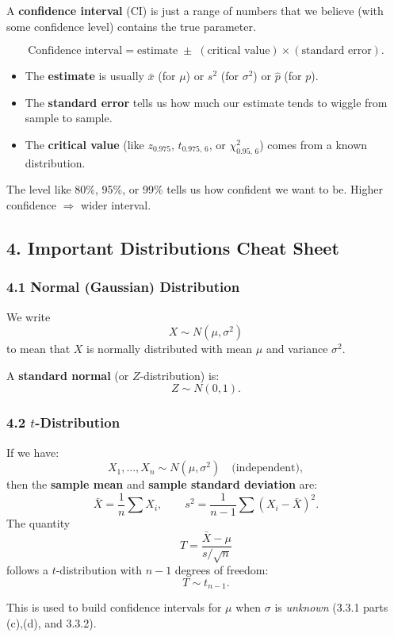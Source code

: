 \documentclass[11pt,letterpaper]{article}
\theoremstyle{remark}
\begin{document}
A \textbf{confidence interval} (CI) is just a range of numbers that we believe (with some confidence level) contains the true parameter.

\[
\text{Confidence interval} = \text{estimate} \;\pm\; (\text{critical value}) \times (\text{standard error}).
\]

\begin{itemize}
    \item The \textbf{estimate} is usually $\bar{x}$ (for $\mu$) or $s^2$ (for $\sigma^2$) or $\hat{p}$ (for $p$).
    \item The \textbf{standard error} tells us how much our estimate tends to wiggle from sample to sample.
    \item The \textbf{critical value} (like $z_{0.975}$, $t_{0.975,\,6}$, or $\chi^2_{0.95,\,6}$) comes from a known distribution.
\end{itemize}

The level like 80\%, 95\%, or 99\% tells us how confident we want to be.
Higher confidence $\Rightarrow$ wider interval.

\subsection*{4. Important Distributions Cheat Sheet}

\subsubsection*{4.1 Normal (Gaussian) Distribution}

We write
\[
X \sim N(\mu, \sigma^2)
\]
to mean that $X$ is normally distributed with mean $\mu$ and variance $\sigma^2$.

A \textbf{standard normal} (or $Z$-distribution) is:
\[
Z \sim N(0, 1).
\]

\subsubsection*{4.2 $t$-Distribution}

If we have:
\[
X_1, \dots, X_n \sim N(\mu, \sigma^2) \quad \text{(independent)},
\]
then the \textbf{sample mean} and \textbf{sample standard deviation} are:
\[
\bar{X} = \frac{1}{n}\sum X_i, \qquad s^2 = \frac{1}{n-1}\sum (X_i - \bar{X})^2.
\]
The quantity
\[
T = \frac{\bar{X} - \mu}{s / \sqrt{n}}
\]
follows a $t$-distribution with $n-1$ degrees of freedom:
\[
T \sim t_{n-1}.
\]

This is used to build confidence intervals for $\mu$ when $\sigma$ is \emph{unknown} (3.3.1 parts (c),(d), and 3.3.2).
\end{document}
